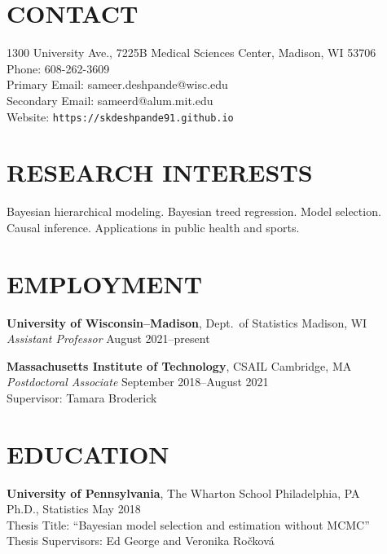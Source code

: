 \documentclass[margin]{res}
\begin{document}
  
                        
\begin{resume}                        
  
  \section{CONTACT} 
  1300 University Ave., 7225B Medical Sciences Center, Madison, WI 53706 \\
  Phone: 608-262-3609 \\ 
  Primary Email: sameer.deshpande@wisc.edu \\
  Secondary Email: sameerd@alum.mit.edu \\
  Website: \texttt{https://skdeshpande91.github.io}

  \section{RESEARCH INTERESTS}
Bayesian hierarchical modeling. Bayesian treed regression. Model selection. Causal inference. Applications in public health and sports. 
              
\section{EMPLOYMENT} 

\textbf{University of Wisconsin--Madison}, Dept.~of Statistics \hfill Madison, WI \\
\textit{Assistant Professor} \hfill August 2021--present

\textbf{Massachusetts Institute of Technology}, CSAIL \hfill Cambridge, MA \\
\emph{Postdoctoral Associate} \hfill September 2018--August 2021 \\
Supervisor: Tamara Broderick
              
\section{EDUCATION}      
                {\bf University of Pennsylvania}, The Wharton School \hfill Philadelphia, PA \\
                Ph.D., Statistics \hfill May 2018 \\
		Thesis Title: ``Bayesian model selection and estimation without MCMC'' \\
		Thesis Supervisors: Ed George and Veronika Ro\v{c}kov\'{a}
                

\end{resume}
\end{document}
